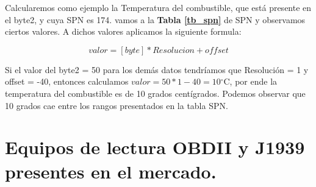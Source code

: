 Calcularemos como ejemplo la Temperatura del combustible, que está presente en el byte2, y cuya SPN es 174. vamos a la \textbf{Tabla \ref{tb_spn}} de SPN y observamos ciertos valores. A dichos valores aplicamos la siguiente formula: 

   $$valor = [byte]*Resolucion + offset$$
  
  Si el valor del byte2 = 50 para los demás datos tendríamos que Resolución = 1 y offset = -40, entonces calculamos   $valor=50*1-40=10$$^{\circ}$C,
  por ende la temperatura del combustible es de 10 grados centígrados. Podemos observar que 10 grados cae entre los rangos presentados en la tabla SPN. 

\section{Equipos de lectura OBDII y J1939 presentes en el mercado.}

